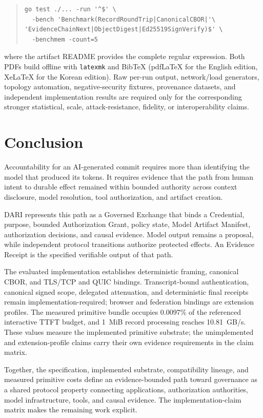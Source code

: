 \documentclass[10pt]{article}
\begin{document}
\begin{quote}\small
\begin{verbatim}
go test ./... -run '^$' \
  -bench 'Benchmark(RecordRoundTrip|CanonicalCBOR|'\
'EvidenceChainNext|ObjectDigest|Ed25519SignVerify)$' \
  -benchmem -count=5
\end{verbatim}
\end{quote}

where the artifact README provides the complete regular expression. Both PDFs build offline with \texttt{latexmk} and BibTeX (pdfLaTeX for the English edition, XeLaTeX for the Korean edition). Raw per-run output, network/load generators, topology automation, negative-security fixtures, provenance datasets, and independent implementation results are required only for the corresponding stronger statistical, scale, attack-resistance, fidelity, or interoperability claims.

\section{Conclusion}

Accountability for an AI-generated commit requires more than identifying the model that produced its tokens. It requires evidence that the path from human intent to durable effect remained within bounded authority across context disclosure, model resolution, tool authorization, and artifact creation.

DARI represents this path as a Governed Exchange that binds a Credential, purpose, bounded Authorization Grant, policy state, Model Artifact Manifest, authorization decisions, and causal evidence. Model output remains a proposal, while independent protocol transitions authorize protected effects. An Evidence Receipt is the specified verifiable output of that path.

The evaluated implementation establishes deterministic framing, canonical CBOR, and TLS/TCP and QUIC bindings. Transcript-bound authentication, canonical signed scope, delegated attenuation, and deterministic final receipts remain implementation-required; browser and federation bindings are extension profiles. The measured primitive bundle occupies 0.0097\% of the referenced interactive TTFT budget, and 1~MiB record processing reaches 10.81~GB/s. These values measure the implemented primitive substrate; the unimplemented and extension-profile claims carry their own evidence requirements in the claim matrix.

Together, the specification, implemented substrate, compatibility lineage, and measured primitive costs define an evidence-bounded path toward governance as a shared protocol property connecting applications, authorization authorities, model infrastructure, tools, and causal evidence. The implementation-claim matrix makes the remaining work explicit.
\end{document}
